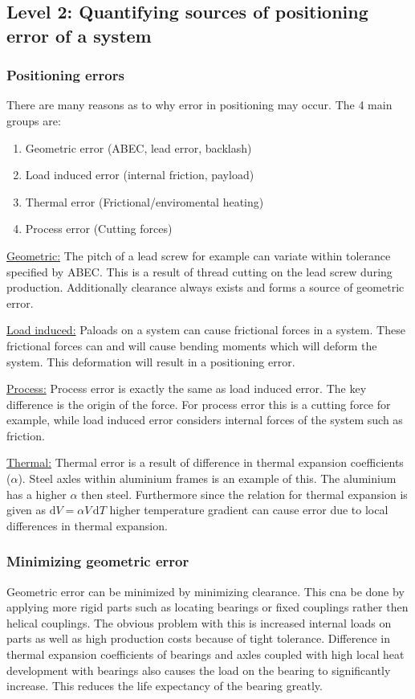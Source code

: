 \documentclass[11pt, a4paper]{article}
\renewcommand*{\d}{\text{d}}
\numberwithin{equation}{section}
\numberwithin{figure}{section}
\begin{document}
\subsection{Level 2: Quantifying sources of positioning error of a system}
\subsubsection{Positioning errors}
There are many reasons as to why error in positioning may occur. The 4 main groups are:
\begin{enumerate}
  \item Geometric error (ABEC, lead error, backlash)
  \item Load induced error (internal friction, payload)
  \item Thermal error (Frictional/enviromental heating)
  \item Process error (Cutting forces)
\end{enumerate}

\underline{Geometric:} The pitch of a lead screw for example can variate within tolerance specified by ABEC. This is a result of thread cutting on the lead screw during production. Additionally clearance always exists and forms a source of geometric error.

\underline{Load induced:} Paloads on a system can cause frictional forces in a system. These frictional forces  can and will cause bending moments which will deform the system. This deformation will result in a positioning error.

\underline{Process:} Process error is exactly the same as load induced error. The key difference is the origin of the force. For process error this is a cutting force for example, while load induced error considers internal forces of the system such as friction.

\underline{Thermal:} Thermal error is a result of difference in thermal expansion coefficients ($\alpha$). Steel axles within aluminium frames is an example of this. The aluminium has a higher $\alpha$ then steel. Furthermore since the relation for thermal expansion is given as $\d V = \alpha V\,\d T$ higher temperature gradient can cause error due to local differences in thermal expansion.


\subsubsection{Minimizing geometric error}
Geometric error can be minimized by minimizing clearance. This cna be done by applying more rigid parts such as locating bearings or fixed couplings rather then helical couplings. The obvious problem with this is increased internal loads on parts as well as high production costs because of tight tolerance. Difference in thermal expansion coefficients of bearings and axles coupled with high local heat development with bearings also causes the load on the bearing to significantly increase. This reduces the life expectancy of the bearing greatly.
\end{document}
